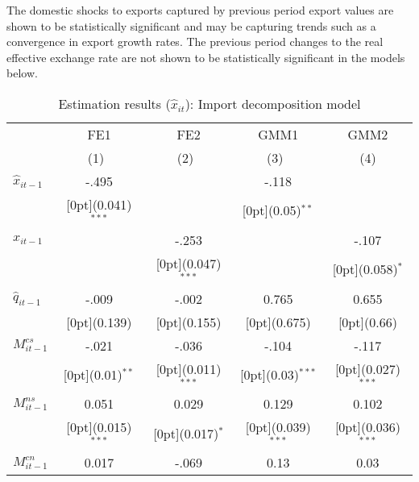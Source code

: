 \documentclass[10pt,letterpaper]{article}
\begin{document}
The domestic shocks to exports captured by previous period export values are shown to be statistically significant and may be capturing trends such as a convergence in export growth rates. The previous period changes to the real effective exchange rate are not shown to be statistically significant in the models below. 

\vspace{5mm}

\begin{table}[htbp]\centering
 \caption{Estimation results ($\hat{x}_{it}$): Import decomposition model
\label{tab:ImportDecompModel}}
\begin{tabular*}{0.8\textwidth}{@{\extracolsep{\fill}}lcccc}				
	& \multicolumn{1}{c}{FE1} &	\multicolumn{1}{c}{FE2} &	\multicolumn{1}{c}{GMM1} &	\multicolumn{1}{c}{GMM2} \\
\cline{2-5}				
	& \multicolumn{1}{c}{(1)\mbox{\ }} &	\multicolumn{1}{c}{(2)\mbox{\ }} &	\multicolumn{1}{c}{(3)\mbox{\ }} &	\multicolumn{1}{c}{(4)} \\
\hline				
$\hat{x}_{it-1}$ &	-.495 &	&	-.118 &	\\
&	\raisebox{.7ex}[0pt]{\scriptsize (0.041)$^{***}$} &	&	\raisebox{.7ex}[0pt]{\scriptsize (0.05)$^{**}$} &	\\
$x_{it-1}$ &	&	-.253 &	&	-.107 \\
&	&	\raisebox{.7ex}[0pt]{\scriptsize (0.047)$^{***}$} &	&	\raisebox{.7ex}[0pt]{\scriptsize (0.058)$^{*}$} \\
$\hat{q}_{it-1}$ &	-.009 &	-.002 &	0.765 &	0.655 \\
&	\raisebox{.7ex}[0pt]{\scriptsize (0.139)} &	\raisebox{.7ex}[0pt]{\scriptsize (0.155)} &	\raisebox{.7ex}[0pt]{\scriptsize (0.675)} &	\raisebox{.7ex}[0pt]{\scriptsize (0.66)} \\
$M^{cs}_{it-1}$ &	-.021 &	-.036 &	-.104 &	-.117 \\
&	\raisebox{.7ex}[0pt]{\scriptsize (0.01)$^{**}$} &	\raisebox{.7ex}[0pt]{\scriptsize (0.011)$^{***}$} &	\raisebox{.7ex}[0pt]{\scriptsize (0.03)$^{***}$} &	\raisebox{.7ex}[0pt]{\scriptsize (0.027)$^{***}$} \\
$M^{ns}_{it-1}$ &	0.051 &	0.029 &	0.129 &	0.102 \\
&	\raisebox{.7ex}[0pt]{\scriptsize (0.015)$^{***}$} &	\raisebox{.7ex}[0pt]{\scriptsize (0.017)$^{*}$} &	\raisebox{.7ex}[0pt]{\scriptsize (0.039)$^{***}$} &	\raisebox{.7ex}[0pt]{\scriptsize (0.036)$^{***}$} \\
$M^{cn}_{it-1}$ &	0.017 &	-.069 &	0.13 &	0.03 \\

\end{tabular*}
\end{table}
\end{document}
